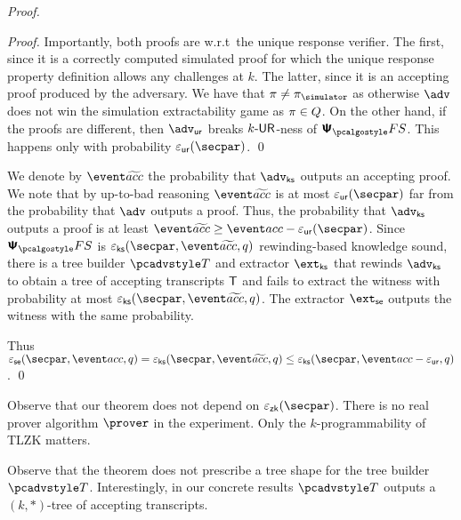 \begin{proof}
\begin{proof}
	Importantly, both proofs are  w.r.t~the unique response verifier. The first, since it is a correctly computed simulated proof for which the unique response property definition allows any challenges at $k$. The latter, since it is an accepting proof produced by the adversary.
	We have that $\zkproof \neq \zkproofs$ as otherwise $\advse$ does not win the simulation extractability game as $\pi \in Q$. On the other hand, if the proofs are different, then $\advur$ breaks ${k\text{-}\mathsf{UR}}$-ness of $\psfs$. This happens only with  probability $\epsur(\secpar)$. 
	\qed
	\end{proof}

	We denote by $\waccProb$ the probability that $\advcss$ outputs an accepting proof. We note that by up-to-bad reasoning $\waccProb$ is at most $\epsur (\secpar)$ far from the probability that $\advse$ outputs a proof. Thus, the probability that $\advcss$ outputs a proof is at least $\waccProb \geq \accProb - \epsur (\secpar)$. %
%
	Since $\psfs$ is $\epscss (\secpar, \waccProb,q)$ rewinding-based knowledge sound, there is a tree builder $\tdv$ and extractor $\extcss$ that rewinds $\advcss$ to obtain a tree of accepting transcripts $\mathsf{T}$ and fails to extract the witness with probability at most $\epscss (\secpar, \waccProb, q)$. The extractor $\extse$ outputs the witness with the same probability.

%
	Thus $\epsse(\secpar,\accProb,q) = \epscss (\secpar, \waccProb,q) \leq \epscss(\secpar,\accProb - \epsur,q)$.
	\qed
	\end{proof}

\begin{remark}
Observe that our theorem does not depend on $\epszk(\secpar)$. There is no real prover algorithm $\prover$ in the experiment. Only the $k$-programmability of TLZK matters. 
\end{remark}

\begin{remark}
Observe that the theorem does not prescribe a tree shape for the tree builder $\tdv$. Interestingly, in our concrete results $\tdv$ outputs a $(k, *)$-tree of accepting transcripts.
\end{remark}


